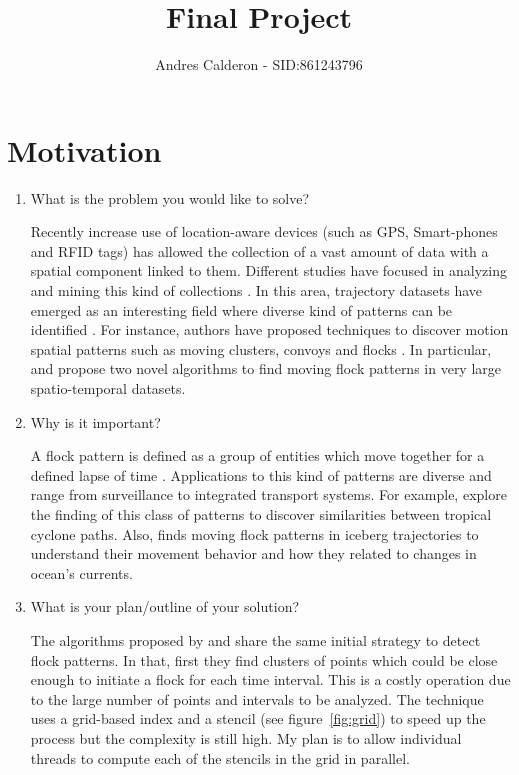 \documentclass[10pt]{scrartcl}
\title{Final Project}
\author{Andres Calderon - SID:861243796}
\begin{document}
\maketitle

\section{Motivation}
\begin{enumerate}
 \item What is the problem you would like to solve?
 
Recently increase use of location-aware devices (such as GPS, Smart-phones and RFID tags) has allowed the collection of a vast amount of data with a spatial component linked to them.  Different studies have focused in analyzing and mining this kind of collections \citep{leung_knowledge_2010}\citep{Miller_2001}.  In this area, trajectory datasets have emerged as an interesting field where diverse kind of patterns can be identified \citep{zheng_computing_2011}\citep{vieira_spatio-temporal_2013}.  For instance, authors have proposed techniques to discover motion spatial patterns such as moving clusters\citep{kalnis_discovering_2005}, convoys\citep{jeung_discovery_2008} and flocks \citep{benkert_reporting_2006}\citep{gudmundsson_computing_2006}.  In particular, \citep{vieira_-line_2009} and \citep{turdukulov_visual_2014} propose two novel algorithms to find moving flock patterns in very large spatio-temporal datasets.  
 
 \item Why is it important?
 
A flock pattern is defined as a group of entities which move together for a defined lapse of time \citep{benkert_reporting_2006}.  Applications to this kind of patterns are diverse and range from surveillance to integrated transport systems.  For example, \citep{turdukulov_visual_2014} explore the finding of this class of patterns to discover similarities between tropical cyclone paths. Also, \citep{calderon_mining_2011} finds moving flock patterns in iceberg trajectories to understand their movement behavior and how they related to changes in ocean's currents. 
 
 \item What is your plan/outline of your solution?
 
The algorithms proposed by \citep{vieira_-line_2009} and \citep{turdukulov_visual_2014} share the same initial strategy to detect flock patterns.  In that, first they find clusters of points which could be close enough to initiate a flock for each time interval.  This is a costly operation due to the large number of points and intervals to be analyzed.  The technique uses a grid-based index and a stencil (see figure~\ref{fig:grid}) to speed up the process but the complexity is still high.  My plan is to allow  individual threads to compute each of the stencils in the grid in parallel.


\end{enumerate}
\end{document}
